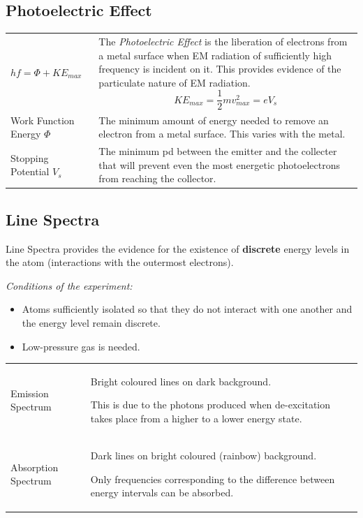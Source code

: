 \documentclass[a4paper,11pt]{article}
\begin{document}
		\subsection{Photoelectric Effect}
			\begin{center}
				\renewcommand{\arraystretch}{1.8}
				\begin{tabular}{@{} l p{10.3cm} @{}}
					\toprule
					$hf=\Phi+KE_{max}$ & The \textit{Photoelectric Effect} is the liberation of electrons from a metal surface when EM radiation of sufficiently high frequency is incident on it. This provides evidence of the particulate nature of EM radiation. $$KE_{max}=\frac{1}{2}mv_{max}^2=eV_{s}$$ \vspace*{-\baselineskip}\\
					Work Function Energy $\Phi$ & The minimum amount of energy needed to remove an electron from a metal surface. This varies with the metal.\\
					Stopping Potential $V_s$ & The minimum pd between the emitter and the collecter that will prevent even the most energetic photoelectrons from reaching the collector. \\
					\bottomrule
				\end{tabular}
			\end{center}
		\subsection{Line Spectra}
			Line Spectra provides the evidence for the existence of \textbf{discrete} energy levels in the atom (interactions with the outermost electrons).
			
			\textit{Conditions of the experiment:}
			\begin{itemize}
				\item Atoms sufficiently isolated so that they do not interact with one another and the energy level remain discrete.
				\item Low-pressure gas is needed.
			\end{itemize}
			
			\begin{center}
				\renewcommand{\arraystretch}{1.8}
				\begin{tabular}{@{} l p{10.9cm} @{}}
					\toprule
					Emission Spectrum & Bright coloured lines on dark background. \par This is due to the photons produced when de-excitation takes place from a higher to a lower energy state. \\
					Absorption Spectrum & Dark lines on bright coloured (rainbow) background. \par Only frequencies corresponding to the difference between energy intervals can be absorbed.\\
					\bottomrule
				\end{tabular}
			\end{center}
		\newpage
\end{document}
